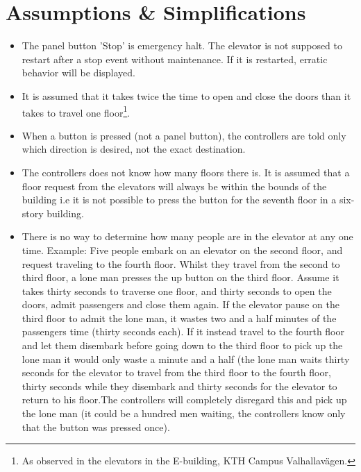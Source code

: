\section{Assumptions \& Simplifications}
\begin{itemize}
\item The panel button 'Stop' is emergency halt. The elevator is not supposed to restart after a stop event without maintenance. If it is restarted, erratic behavior will be displayed.
\item It is assumed that it takes twice the time to open and close the doors than it takes to travel one floor\footnote{As observed in the elevators in the E-building, KTH Campus Valhallavägen.}.
\item When a button is pressed (not a panel button), the controllers are told only which direction is desired, not the exact destination. 
\item The controllers does not know how many floors there is. It is assumed that a floor request from the elevators will always be within the bounds of the building i.e it is not possible to press the button for the seventh floor in a six-story building.
\item There is no way to determine how many people are in the elevator at any one time. 
Example:\newline
Five people embark on an elevator on the second floor, and request traveling to the fourth floor. Whilst they travel from the second to third floor, a lone man presses the up button on the third floor. Assume it takes thirty seconds to traverse one floor, and thirty seconds to open the doors, admit passengers and close them again. If the elevator pause on the third floor to admit the lone man, it wastes two and a half minutes of the passengers time (thirty seconds each). If it instead travel to the fourth floor and let them disembark before going down to the third floor to pick up the lone man it would only waste a minute and a half (the lone man waits thirty seconds for the elevator to travel from the third floor to the fourth floor, thirty seconds while they disembark and thirty seconds for the elevator to return to his floor.\newline The controllers will completely disregard this and pick up the lone man (it could be a hundred men waiting, the controllers know only that the button was pressed once).
\end{itemize}